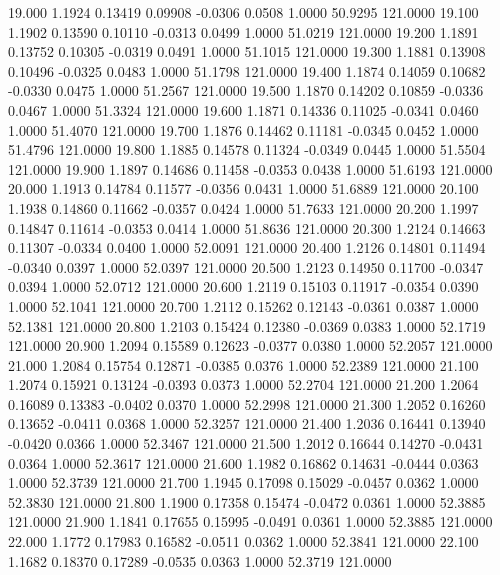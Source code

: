   19.000   1.1924   0.13419   0.09908  -0.0306   0.0508   1.0000  50.9295 121.0000
  19.100   1.1902   0.13590   0.10110  -0.0313   0.0499   1.0000  51.0219 121.0000
  19.200   1.1891   0.13752   0.10305  -0.0319   0.0491   1.0000  51.1015 121.0000
  19.300   1.1881   0.13908   0.10496  -0.0325   0.0483   1.0000  51.1798 121.0000
  19.400   1.1874   0.14059   0.10682  -0.0330   0.0475   1.0000  51.2567 121.0000
  19.500   1.1870   0.14202   0.10859  -0.0336   0.0467   1.0000  51.3324 121.0000
  19.600   1.1871   0.14336   0.11025  -0.0341   0.0460   1.0000  51.4070 121.0000
  19.700   1.1876   0.14462   0.11181  -0.0345   0.0452   1.0000  51.4796 121.0000
  19.800   1.1885   0.14578   0.11324  -0.0349   0.0445   1.0000  51.5504 121.0000
  19.900   1.1897   0.14686   0.11458  -0.0353   0.0438   1.0000  51.6193 121.0000
  20.000   1.1913   0.14784   0.11577  -0.0356   0.0431   1.0000  51.6889 121.0000
  20.100   1.1938   0.14860   0.11662  -0.0357   0.0424   1.0000  51.7633 121.0000
  20.200   1.1997   0.14847   0.11614  -0.0353   0.0414   1.0000  51.8636 121.0000
  20.300   1.2124   0.14663   0.11307  -0.0334   0.0400   1.0000  52.0091 121.0000
  20.400   1.2126   0.14801   0.11494  -0.0340   0.0397   1.0000  52.0397 121.0000
  20.500   1.2123   0.14950   0.11700  -0.0347   0.0394   1.0000  52.0712 121.0000
  20.600   1.2119   0.15103   0.11917  -0.0354   0.0390   1.0000  52.1041 121.0000
  20.700   1.2112   0.15262   0.12143  -0.0361   0.0387   1.0000  52.1381 121.0000
  20.800   1.2103   0.15424   0.12380  -0.0369   0.0383   1.0000  52.1719 121.0000
  20.900   1.2094   0.15589   0.12623  -0.0377   0.0380   1.0000  52.2057 121.0000
  21.000   1.2084   0.15754   0.12871  -0.0385   0.0376   1.0000  52.2389 121.0000
  21.100   1.2074   0.15921   0.13124  -0.0393   0.0373   1.0000  52.2704 121.0000
  21.200   1.2064   0.16089   0.13383  -0.0402   0.0370   1.0000  52.2998 121.0000
  21.300   1.2052   0.16260   0.13652  -0.0411   0.0368   1.0000  52.3257 121.0000
  21.400   1.2036   0.16441   0.13940  -0.0420   0.0366   1.0000  52.3467 121.0000
  21.500   1.2012   0.16644   0.14270  -0.0431   0.0364   1.0000  52.3617 121.0000
  21.600   1.1982   0.16862   0.14631  -0.0444   0.0363   1.0000  52.3739 121.0000
  21.700   1.1945   0.17098   0.15029  -0.0457   0.0362   1.0000  52.3830 121.0000
  21.800   1.1900   0.17358   0.15474  -0.0472   0.0361   1.0000  52.3885 121.0000
  21.900   1.1841   0.17655   0.15995  -0.0491   0.0361   1.0000  52.3885 121.0000
  22.000   1.1772   0.17983   0.16582  -0.0511   0.0362   1.0000  52.3841 121.0000
  22.100   1.1682   0.18370   0.17289  -0.0535   0.0363   1.0000  52.3719 121.0000
